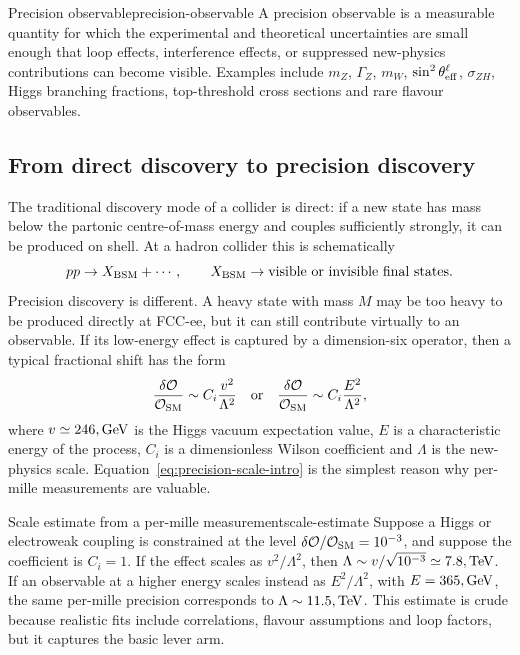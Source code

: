 \documentclass[11pt,a4paper]{article}
\newcommand{\GeV}{\mathrm{GeV}}
\newcommand{\TeV}{\mathrm{TeV}}
\newcommand{\mZ}{m_Z}
\newcommand{\gZ}{\Gamma_Z}
\newcommand{\mW}{m_W}
\newcommand{\sintw}{\sin^2\theta_{\rm eff}^{\ell}}
\numberwithin{equation}{section}
\begin{document}
\begin{definition}{Precision observable}{precision-observable}
A precision observable is a measurable quantity for which the experimental and theoretical uncertainties are small enough that loop effects, interference effects, or suppressed new-physics contributions can become visible. Examples include \(\mZ\), \(\gZ\), \(\mW\), \(\sintw\), \(\sigma_{ZH}\), Higgs branching fractions, top-threshold cross sections and rare flavour observables.
\end{definition}

\subsection{From direct discovery to precision discovery}
The traditional discovery mode of a collider is direct: if a new state has mass below the partonic centre-of-mass energy and couples sufficiently strongly, it can be produced on shell. At a hadron collider this is schematically
\begin{equation}
  pp \to X_{\rm BSM} + \cdots,
  \qquad
  X_{\rm BSM} \to \text{visible or invisible final states} .
\end{equation}
Precision discovery is different. A heavy state with mass \(M\) may be too heavy to be produced directly at FCC-ee, but it can still contribute virtually to an observable. If its low-energy effect is captured by a dimension-six operator, then a typical fractional shift has the form
\begin{equation}
  \frac{\delta \mathcal O}{\mathcal O_{\rm SM}}
  \sim C_i\frac{v^2}{\Lambda^2}
  \quad \text{or} \quad
  \frac{\delta \mathcal O}{\mathcal O_{\rm SM}}
  \sim C_i\frac{E^2}{\Lambda^2},
  \label{eq:precision-scale-intro}
\end{equation}
where \(v\simeq246\\,\GeV\) is the Higgs vacuum expectation value, \(E\) is a characteristic energy of the process, \(C_i\) is a dimensionless Wilson coefficient and \(\Lambda\) is the new-physics scale. Equation~\eqref{eq:precision-scale-intro} is the simplest reason why per-mille measurements are valuable.

\begin{examplebox}{Scale estimate from a per-mille measurement}{scale-estimate}
Suppose a Higgs or electroweak coupling is constrained at the level \(\delta\mathcal O/\mathcal O_{\rm SM}=10^{-3}\), and suppose the coefficient is \(C_i=1\). If the effect scales as \(v^2/\Lambda^2\), then \(\Lambda\sim v/\sqrt{10^{-3}}\simeq7.8\\,\TeV\). If an observable at a higher energy scales instead as \(E^2/\Lambda^2\), with \(E=365\\,\GeV\), the same per-mille precision corresponds to \(\Lambda\sim11.5\\,\TeV\). This estimate is crude because realistic fits include correlations, flavour assumptions and loop factors, but it captures the basic lever arm.
\end{examplebox}
\end{document}
